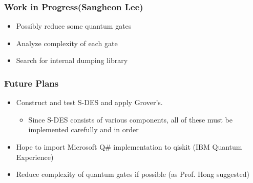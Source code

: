 \documentclass{beamer}
\begin{document}
	\begin{frame}
		\frametitle{Work in Progress(Sangheon Lee)}
		\begin{itemize}
            \item Possibly reduce some quantum gates
            \item Analyze complexity of each gate
            \item Search for internal dumping library
		\end{itemize}
	\end{frame}
	
	\begin{frame}
		\frametitle{Future Plans}
		\begin{itemize}
			\item Construct and test S-DES and apply Grover's.
            \begin{itemize}
                \item Since S-DES consists of various components, all of these must be implemented carefully and in order
            \end{itemize}
            \item Hope to import Microsoft Q\# implementation to qiskit (IBM Quantum Experience)
            \item Reduce complexity of quantum gates if possible (as Prof. Hong suggested)
		\end{itemize}
	\end{frame}
\end{document}
